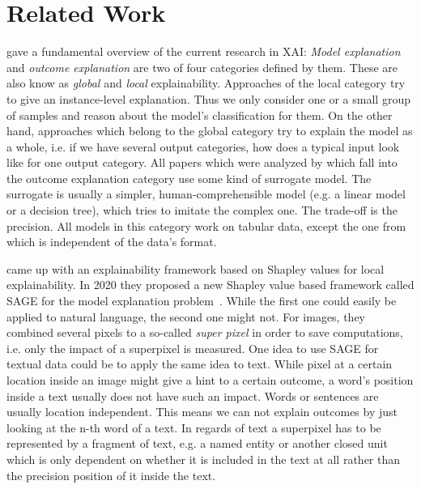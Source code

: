 \section{Related Work}
\label{sec:related_work}

\citet{guidotti2018survey} gave a fundamental overview of the current research in XAI: 
\emph{Model explanation} and \emph{outcome explanation} are two of four 
categories defined by them. These are also know as
\emph{global} and \emph{local} explainability. Approaches of the local category try to
give an  instance-level explanation. Thus we only consider one or a small group of samples
and reason about the model's classification for them. On the other hand, approaches which 
belong to the global category try to explain the model as a whole, i.e. if we have several
output categories, how does a typical input look like for one output category. All papers
which were analyzed by \citet{guidotti2018survey} which fall into the outcome explanation
category use  some kind of surrogate model. The surrogate is usually a simpler,
human-comprehensible model  (e.g. a linear model or a decision tree), which tries to
imitate the complex one. The  trade-off is the precision. All models in this category work
on tabular data, except the one from \citet{krishnan2017palm} which is independent of the
data's format. 

\citet{Lundberg_2017} came up with an explainability framework based on Shapley values for 
local explainability. In 2020 they proposed a new Shapley value based framework called
SAGE for the model explanation problem~\citep{NEURIPS2020_c7bf0b7c}. While the first one
could easily be applied to natural  language, the second one might not. For images, they
combined several pixels to a so-called \emph{super pixel} in order to save computations, i.e.
only the impact of a superpixel is  measured. One idea to use SAGE for  textual data
could be to apply the same idea to text. While pixel at a certain location inside an image 
might give a hint to a certain outcome, a word's position inside a text usually does not 
have such an impact. Words or sentences are usually location independent. This means we 
can not explain outcomes by just looking at the n-th word of a text. In regards of
text a superpixel has to be represented by a fragment of text, e.g. a named entity or another closed 
unit which is only dependent on whether it is included in the text at all rather than the 
precision position of it inside the text.

